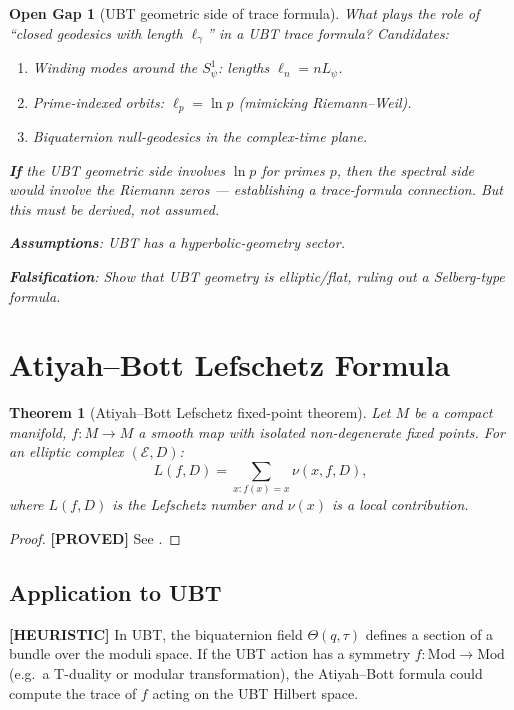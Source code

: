 \documentclass[11pt,a4paper]{article}
\newtheorem{theorem}{Theorem}
\newtheorem{gap}{Open Gap}
\newcommand{\proved}[1]{\textbf{[PROVED]} #1}
\newcommand{\heuristic}[1]{\textbf{[HEURISTIC]} #1}
\begin{document}
\begin{gap}[UBT geometric side of trace formula]
  What plays the role of ``closed geodesics with length $\ell_\gamma$'' in
  a UBT trace formula?  Candidates:
  \begin{enumerate}
    \item Winding modes around the $S^1_\psi$: lengths $\ell_n = nL_\psi$.
    \item Prime-indexed orbits: $\ell_p = \ln p$ (mimicking Riemann--Weil).
    \item Biquaternion null-geodesics in the complex-time plane.
  \end{enumerate}

  \textbf{If} the UBT geometric side involves $\ln p$ for primes $p$,
  then the spectral side would involve the Riemann zeros — establishing a
  trace-formula connection.  But this must be \emph{derived}, not assumed.

  \textbf{Assumptions}: UBT has a hyperbolic-geometry sector.

  \textbf{Falsification}: Show that UBT geometry is elliptic/flat, ruling out
  a Selberg-type formula.
\end{gap}

\section{Atiyah--Bott Lefschetz Formula}

\begin{theorem}[Atiyah--Bott Lefschetz fixed-point theorem]
  Let $M$ be a compact manifold, $f: M \to M$ a smooth map with isolated
  non-degenerate fixed points.  For an elliptic complex $(\mathcal{E}, D)$:
  \[
    L(f,D) = \sum_{x: f(x)=x} \nu(x,f,D),
  \]
  where $L(f,D)$ is the Lefschetz number and $\nu(x)$ is a local contribution.
\end{theorem}

\begin{proof}
  \proved{} See \cite{AtiyahBott}.
\end{proof}

\subsection{Application to UBT}

\heuristic{In UBT, the biquaternion field $\Theta(q,\tau)$ defines a section
of a bundle over the moduli space.  If the UBT action has a symmetry
$f: \mathrm{Mod} \to \mathrm{Mod}$ (e.g.\ a T-duality or modular transformation),
the Atiyah--Bott formula could compute the trace of $f$ acting on the
UBT Hilbert space.}
\end{document}
